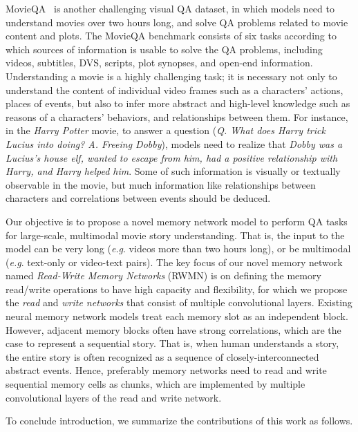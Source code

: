 \documentclass[10pt,twocolumn,letterpaper]{article}
\makeatletter
\theoremstyle{nonumberplain}
\DeclareRobustCommand\onedot{\futurelet\@let@token\@onedot}
\def\onedot{.\@\xspace}
\def\eg{\emph{e.g}\onedot} \def\Eg{\emph{E.g}\onedot}
\makeatother
\begin{document}
MovieQA~\cite{tapaswi2016movieqa} is another challenging visual QA dataset, in which models need to understand movies over two hours long, and solve QA problems related to movie content and plots. 
The MovieQA benchmark consists of six tasks according to which sources of information is usable to solve the QA problems, including videos, subtitles, DVS, scripts, plot synopses, and open-end information. 
Understanding a movie is a highly challenging task; it is necessary not only to understand the content of individual video frames such as a characters' actions, places of events, but also to infer more abstract and high-level knowledge such as reasons of a characters' behaviors, and relationships between them. 
For instance, in the \textit{Harry Potter} movie, to answer a question (\textit{Q. What does Harry trick Lucius into doing? A. Freeing Dobby}), models need to realize that \textit{Dobby was a Lucius's house elf, wanted to escape from him, had a positive relationship with Harry, and Harry helped him}. 
Some of such information is visually or textually observable in the movie, but much information like relationships between characters and correlations between events should be deduced. 


Our objective is to propose a novel memory network model to perform QA tasks for large-scale, multimodal movie story understanding. 
That is, the input to the model can be very long (\eg videos more than two hours long), or be multimodal (\eg text-only or video-text pairs). 
The key focus of our novel memory network named \textit{Read-Write Memory Networks} (RWMN)  is on defining the memory read/write operations to have high capacity and flexibility, 
for which we propose the \textit{read} and \textit{write networks} that consist of multiple convolutional layers. 
Existing neural memory network models treat each memory slot as an independent block. 
However, adjacent memory blocks often have strong correlations, which are the case to represent a sequential story. 
That is, when human understands a story, the entire story is often recognized as a sequence of closely-interconnected abstract events. Hence, preferably memory networks need to read and write sequential memory cells as chunks, which are implemented by multiple convolutional layers of the read and write network. 


To conclude introduction, we summarize the contributions of this work as follows.
\end{document}
